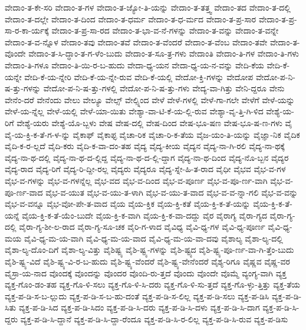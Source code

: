 {ವೇದಾಂ-ತ-ಕೇ-ಸರಿ
ವೇದಾಂ-ತ-ಗಳ
ವೇದಾಂ-ತ-ಜ್ಯೋ-ತಿ-ಯನ್ನು
ವೇದಾಂ-ತ-ತತ್ತ್ವ
ವೇದಾಂ-ತದ
ವೇದಾಂ-ತ-ದಲ್ಲಿ
ವೇದಾಂ-ತ-ದಲ್ಲೇ
ವೇದಾಂ-ತ-ದಿಂದ
ವೇದಾಂ-ತ-ಧರ್ಮ
ವೇದಾಂ-ತ-ಧ-ರ್ಮದ
ವೇದಾಂ-ತ-ಪ್ರ-ಸಾರ
ವೇದಾಂ-ತ-ಪ್ರ-ಸಾ-ರ-ಕಾ-ರ್ಯಕ್ಕೆ
ವೇದಾಂ-ತ-ಪ್ರ-ಸಾ-ರದ
ವೇದಾಂ-ತ-ಭಾ-ವ-ನೆ-ಗಳನ್ನು
ವೇದಾಂ-ತ-ವನ್ನು
ವೇದಾಂ-ತ-ವನ್ನೇ
ವೇದಾಂ-ತ-ವ-ನ್ನೊಳ
ವೇದಾಂ-ತವು
ವೇದಾಂ-ತವೆ
ವೇದಾಂ-ತ-ವೆಂದರೆ
ವೇದಾಂ-ತ-ವೆಂಬ
ವೇದಾಂ-ತವೇ
ವೇದಾಂ-ತ-ವೊಂದೇ
ವೇದಾಂ-ತ-ಸಿ-ದ್ಧಾಂ-ತ-ಗ-ಳೆಂ-ಬುದು
ವೇದಾಂ-ತ-ಸೂ-ತ್ರ-ಗಳು
ವೇದಾಂತಿ
ವೇದಾಂ-ತಿ-ಗಳ
ವೇದಾಂ-ತಿ-ಗಳು
ವೇದಾಂ-ತಿ-ಗಳೂ
ವೇದಾಂ-ತಿ-ಯಿ-ರ-ಬ-ಹುದು
ವೇದಾ-ಧ್ಯ-ಯನ
ವೇದಾ-ಧ್ಯ-ಯ-ನ-ವನ್ನು
ವೇದಿ-ಕೆಯ
ವೇದಿ-ಕೆ-ಯನ್ನೇ
ವೇದಿ-ಕೆ-ಯ-ನ್ನೇರಿ
ವೇದಿ-ಕೆ-ಯ-ನ್ನೇ-ರುವ
ವೇದಿ-ಕೆ-ಯಲ್ಲಿ
ವೇದೋ-ಕ್ತಿ-ಗಳನ್ನು
ವೇದೋಪ
ವೇದೋ-ಪ-ನಿ-ಷ-ತ್ತು-ಗಳನ್ನು
ವೇದೋ-ಪ-ನಿ-ಷ-ತ್ತು-ಗಳಲ್ಲಿ
ವೇದೋ-ಪ-ನಿ-ಷ-ತ್ತು-ಗಳು
ವೇದ್ಯ-ವಾ-ಗಿತ್ತು
ವೇನಿ-ದ್ದರೂ
ವೇನು
ವೇನೆಂ-ದರೆ
ವೇನೆಂದು
ವೇಲು
ವೇಲ್ಯೂ
ವೇಲ್ಸ್
ವೇಲ್ಸ್ನಿಂದ
ವೇಳೆ
ವೇಳೆ-ಗಳಲ್ಲಿ
ವೇಳೆ-ಗಾ-ಗಲೇ
ವೇಳೆಗೆ
ವೇಳೆ-ಯನ್ನು
ವೇಳೆ-ಯ-ನ್ನೆಲ್ಲ
ವೇಳೆ-ಯಲ್ಲಿ
ವೇಳೆ-ಯಾ-ಯಿತು
ವೇಶ್ಯಾ-ವಾ-ಟಿ-ಕೆ-ಯ-ಲ್ಲಿ-ರುವ
ವೇಶ್ಯಾ-ವೃ-ತ್ತಿ-ಗಿ-ಳಿದ
ವೇಶ್ಯೆ-ಯ-ರಿಗೆ
ವೇಶ್ಯೆ-ಯರು
ವೇಶ್ಯೆ-ಯೊ-ಬ್ಬಳು
ವೇಷ
ವೇಷ-ದಲ್ಲಿ
ವೇಷ-ದಿಂದ
ವೇಷ-ಭೂ-ಷಣ
ವೇಷ-ಭೂ-ಷ-ಣ-ಗಳು
ವೈ
ವೈ-ಯ-ಕ್ತಿ-ಕ-ತೆ-ಗ-ಳ-ನ್ನು
ವೈಕಾಫ್
ವೈಕಾಫ್ಳ
ವೈಚಾ-ರಿಕ
ವೈಚಾ-ರಿ-ಕ-ತೆಯ
ವೈಜ-ಯಂ-ತಿ-ಯನ್ನು
ವೈಜ್ಞಾ-ನಿಕ
ವೈದಿಕ
ವೈದಿ-ಕ-ರ-ಲ್ಲದೆ
ವೈದಿ-ಕರು
ವೈದಿ-ಕ-ವಾ-ದಂ-ತಹ
ವೈದ್ಯ
ವೈದ್ಯ-ಕೀಯ
ವೈದ್ಯನ
ವೈದ್ಯ-ನಾ-ಗಿ-ರಲಿ
ವೈದ್ಯ-ನಾ-ಥಕ್ಕೆ
ವೈದ್ಯ-ನಾ-ಥ-ದಲ್ಲಿ
ವೈದ್ಯ-ನಾ-ಥ-ದ-ಲ್ಲಿದ್ದ
ವೈದ್ಯ-ನಾ-ಥ-ದ-ಲ್ಲಿ-ದ್ದಾಗ
ವೈದ್ಯ-ನಾ-ಥ-ದಿಂದ
ವೈದ್ಯ-ನೊ-ಬ್ಬನ
ವೈದ್ಯರ
ವೈದ್ಯ-ರಾದ
ವೈದ್ಯ-ರಿಗೆ
ವೈದ್ಯ-ರಿ-ದ್ದೀ-ರಲ್ಲ
ವೈದ್ಯರು
ವೈದ್ಯರೂ
ವೈದ್ಯ-ಸ್ನೇ-ಹಿ-ತ-ರಾದ
ವೈಧೀ
ವೈಭವ
ವೈಭ-ವ-ಗಳ
ವೈಭ-ವ-ಗಳನ್ನು
ವೈಭ-ವ-ಗಳನ್ನೆಲ್ಲ
ವೈಭ-ವದ
ವೈಭ-ವ-ದಿಂದ
ವೈಭ-ವ-ಪೂರ್ಣ
ವೈಭ-ವ-ಪೂ-ರ್ಣ-ವಾಗಿ
ವೈಭ-ವ-ಪೂ-ರ್ಣ-ವಾದ
ವೈಭ-ವ-ಯುತ
ವೈಭ-ವ-ಯು-ತ-ಳಾಗಿ
ವೈಭ-ವ-ಯು-ತ-ವಾದ
ವೈಭ-ವ-ವ-ನ್ನಾ-ಗಲಿ
ವೈಭ-ವ-ವನ್ನು
ವೈಭ-ವ-ವನ್ನೂ
ವೈಭ-ವೋ-ಪೇ-ತ-ವಾದ
ವೈಯ
ವೈಯ-ಕ್ತಿಕ
ವೈಯ-ಕ್ತಿ-ಕತೆ
ವೈಯ-ಕ್ತಿ-ಕ-ತೆ-ಯನ್ನು
ವೈಯ-ಕ್ತಿ-ಕ-ತೆ-ಯನ್ನೆ
ವೈಯ-ಕ್ತಿ-ಕ-ತೆ-ಯೆಂ-ಬುದೇ
ವೈಯ-ಕ್ತಿ-ಕ-ವಾಗಿ
ವೈಯ-ಕ್ತಿ-ಕ-ವಾ-ದದ್ದು
ವೈರ
ವೈರಾಗ್ಯ
ವೈರಾ-ಗ್ಯದ
ವೈರಾ-ಗ್ಯ-ದಲ್ಲಿ
ವೈರಾ-ಗ್ಯ-ಶೀ-ಲ-ರಾದ
ವೈರಾ-ಗ್ಯ-ಸೂ-ಚಕ
ವೈರಿ-ಗ-ಳಾದ
ವೈವಿಧ್ಯ
ವೈವಿ-ಧ್ಯ-ಗಳ
ವೈವಿ-ಧ್ಯ-ಪೂರ್ಣ
ವೈವಿ-ಧ್ಯ-ಮಯ
ವೈವಿ-ಧ್ಯ-ಮ-ಯ-ವಾಗಿ
ವೈವಿ-ಧ್ಯ-ಮ-ಯ-ವಾದ
ವೈವಿ-ಧ್ಯ-ಮ-ಯ-ವಾ-ದವು
ವೈಶಾಲ್ಯ
ವೈಶಾ-ಲ್ಯ-ದಲ್ಲಿ
ವೈಶಾ-ಲ್ಯ-ದೊಂ-ದಿಗೆ
ವೈಶಾ-ಲ್ಯ-ವಿತ್ತು
ವೈಶಿಷ್ಟ್ಯ
ವೈಶಿ-ಷ್ಟ್ಯ-ಗಳನ್ನು
ವೈಶಿ-ಷ್ಟ್ಯದ
ವೈಶಿ-ಷ್ಟ್ಯ-ಪೂ-ರ್ಣ-ವಾ-ಗಿ-ತ್ತೆಂ-ಬುದು
ವೈಶಿ-ಷ್ಟ್ಯ-ವಿದೆ
ವೈಶಿ-ಷ್ಟ್ಯ-ವಿ-ರ-ಬ-ಹುದು
ವೈಶಿ-ಷ್ಟ್ಯ-ವೆಂದರೆ
ವೈಶಿ-ಷ್ಟ್ಯ-ವೇನೆಂದರೆ
ವೈಶ್ಯ-ರಿಗೂ
ವೈಷ್ಣವ
ವೈಷ್ಣ-ವರ
ವೈಸ್ರಾ-ಯ-ನಾದ
ವೊಂದಕ್ಕೆ
ವೊಂದನ್ನು
ವೊಂದರ
ವೊಂದಿ-ರು-ತ್ತದೆ
ವೊಂದು
ವೊಂದೇ
ವೊಮ್ಮೆ
ವ್ಯಂಗ್ಯ-ವಾಗಿ
ವ್ಯಕ್ತ
ವ್ಯಕ್ತ-ಗೊಂ-ಡಂ-ತಹ
ವ್ಯಕ್ತ-ಗೊ-ಳಿ-ಸಲು
ವ್ಯಕ್ತ-ಗೊ-ಳಿ-ಸಿ-ದರು
ವ್ಯಕ್ತ-ಗೊ-ಳಿ-ಸು-ತ್ತದೆ
ವ್ಯಕ್ತ-ಗೊ-ಳ್ಳು-ತ್ತಿತ್ತು
ವ್ಯಕ್ತ-ತೆಯ
ವ್ಯಕ್ತ-ಪ-ಡಿ-ಸ-ಬ-ಲ್ಲುದು
ವ್ಯಕ್ತ-ಪ-ಡಿ-ಸ-ಬ-ಹು-ದಂತೆ
ವ್ಯಕ್ತ-ಪ-ಡಿ-ಸ-ಲಿಲ್ಲ
ವ್ಯಕ್ತ-ಪ-ಡಿ-ಸಲು
ವ್ಯಕ್ತ-ಪ-ಡಿಸಿ
ವ್ಯಕ್ತ-ಪ-ಡಿ-ಸಿತು
ವ್ಯಕ್ತ-ಪ-ಡಿ-ಸಿದ
ವ್ಯಕ್ತ-ಪ-ಡಿ-ಸಿದಂ
ವ್ಯಕ್ತ-ಪ-ಡಿ-ಸಿ-ದರು
ವ್ಯಕ್ತ-ಪ-ಡಿ-ಸಿ-ದಳು
ವ್ಯಕ್ತ-ಪ-ಡಿ-ಸಿ-ದಾಗ
ವ್ಯಕ್ತ-ಪ-ಡಿ-ಸಿ-ದ್ದರು
ವ್ಯಕ್ತ-ಪ-ಡಿ-ಸಿ-ದ್ದಾನೆ
ವ್ಯಕ್ತ-ಪ-ಡಿ-ಸಿ-ದ್ದಾ-ರೆಂದೂ
ವ್ಯಕ್ತ-ಪ-ಡಿ-ಸಿ-ರ-ಲಿಲ್ಲ
ವ್ಯಕ್ತ-ಪ-ಡಿ-ಸಿ-ರುವ
ವ್ಯಕ್ತ-ಪ-ಡಿಸು
}
